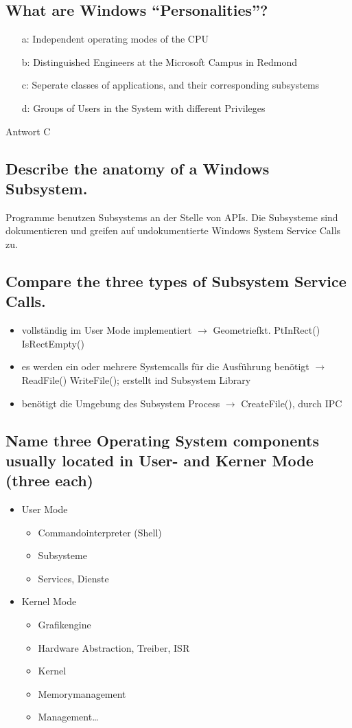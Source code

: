 \subsection{What are Windows ``Personalities''?}
\begin{enumerate}
	\item[a:] Independent operating modes of the CPU
	\item[b:] Distinguished Engineers at the Microsoft Campus in Redmond
	\item[c:] Seperate classes of applications, and their corresponding subsystems
	\item[d:] Groups of Users in the System with different Privileges
\end{enumerate}
Antwort C

\subsection{Describe the anatomy of a Windows Subsystem.}
Programme benutzen Subsystems an der Stelle von APIs. Die Subsysteme sind dokumentieren und greifen auf undokumentierte Windows System Service Calls zu.

\subsection{Compare the three types of Subsystem Service Calls.}
\begin{itemize}
	\setlength\itemsep{-0.5em}
	\item vollst\"andig im User Mode implementiert $\rightarrow$ Geometriefkt. PtInRect() IsRectEmpty()
	\item es werden ein oder mehrere Systemcalls f\"ur die Ausf\"uhrung ben\"otigt $\rightarrow$ ReadFile() WriteFile(); erstellt ind Subsystem Library
	\item ben\"otigt die Umgebung des Subsystem Process $\rightarrow$ CreateFile(), durch IPC 
\end{itemize}

\subsection{Name three Operating System components usually located in User- and Kerner Mode (three each)}
\begin{itemize}
	\setlength\itemsep{-0.5em}
	\item User Mode
	\begin{itemize}
		\item Commandointerpreter (Shell)
		\item Subsysteme
		\item Services, Dienste
	\end{itemize}
	\item Kernel Mode
	\begin{itemize}
		\item Grafikengine
		\item Hardware Abstraction, Treiber, ISR
		\item Kernel
		\item Memorymanagement
		\item Management\dots
	\end{itemize}
\end{itemize}

